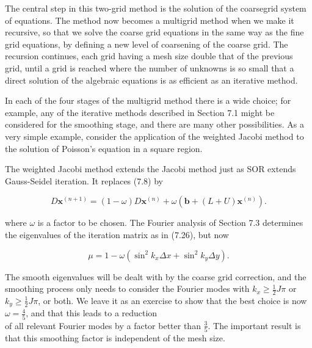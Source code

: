 \documentclass[10pt]{article}
\begin{document}
The central step in this two-grid method is the solution of the coarsegrid system of equations. The method now becomes a multigrid method when we make it recursive, so that we solve the coarse grid equations in the same way as the fine grid equations, by defining a new level of coarsening of the coarse grid. The recursion continues, each grid having a mesh size double that of the previous grid, until a grid is reached where the number of unknowns is so small that a direct solution of the algebraic equations is as efficient as an iterative method.

In each of the four stages of the multigrid method there is a wide choice; for example, any of the iterative methods described in Section 7.1 might be considered for the smoothing stage, and there are many other possibilities. As a very simple example, consider the application of the weighted Jacobi method to the solution of Poisson's equation in a square region.

The weighted Jacobi method extends the Jacobi method just as SOR extends Gauss-Seidel iteration. It replaces (7.8) by

\[
D \mathbf{x}^{(n+1)}=(1-\omega) D \mathbf{x}^{(n)}+\omega\left(\mathbf{b}+(L+U) \mathbf{x}^{(n)}\right) .
\]

where \(\omega\) is a factor to be chosen. The Fourier analysis of Section 7.3 determines the eigenvalues of the iteration matrix as in (7.26), but now

\[
\mu=1-\omega\left(\sin ^{2} k_{x} \Delta x+\sin ^{2} k_{y} \Delta y\right) .
\]

The smooth eigenvalues will be dealt with by the coarse grid correction, and the smoothing process only needs to consider the Fourier modes with \(k_{x} \geq \frac{1}{2} J \pi\) or \(k_{y} \geq \frac{1}{2} J \pi\), or both. We leave it as an exercise to show that the best choice is now \(\omega=\frac{4}{5}\), and that this leads to a reduction\\
of all relevant Fourier modes by a factor better than \(\frac{3}{5}\). The important result is that this smoothing factor is independent of the mesh size.
\end{document}
